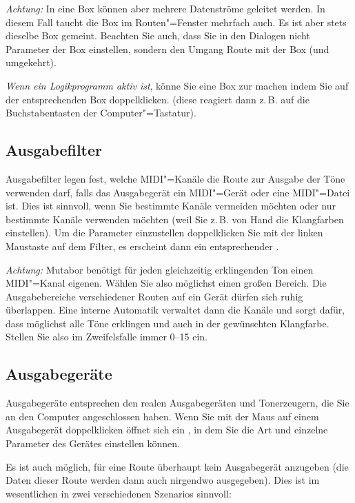 \emph{Achtung:} In eine Box können aber mehrere Datenströme 
geleitet werden. In diesem Fall taucht die Box im Routen"=Fenster 
mehrfach auch. Es ist aber stets dieselbe Box gemeint. Beachten 
Sie auch, dass Sie in den Dialogen nicht Parameter der Box einstellen, 
sondern den Umgang Route mit der Box (und umgekehrt).


\emph{Wenn ein Logikprogramm aktiv ist}, könne Sie eine Box 
zur  machen indem Sie auf der 
entsprechenden Box doppelklicken. (diese reagiert dann z.\,B. auf 
die Buchstabentasten der Computer"=Tastatur).

\subsection{Ausgabefilter}\label{sec:ausgabefilter}

Ausgabefilter legen fest, welche MIDI"=Kanäle die Route zur Ausgabe der 
Töne verwenden darf, falls das Ausgabegerät ein MIDI"=Gerät 
oder eine MIDI"=Datei ist. Dies ist sinnvoll, wenn Sie bestimmte 
Kanäle vermeiden möchten oder nur bestimmte Kanäle verwenden 
möchten (weil Sie z.\,B. von Hand die Klangfarben einstellen). 
Um die Parameter einzustellen doppelklicken Sie mit der linken 
Maustaste auf dem Filter, es erscheint dann ein entsprechender 
.


\emph{Achtung:} Mutabor benötigt für jeden gleichzeitig erklingenden
Ton einen MIDI"=Kanal eigenen. Wählen Sie also möglichst einen großen
Bereich. Die Ausgabebereiche verschiedener Routen auf ein Gerät dürfen
sich ruhig überlappen. Eine interne Automatik verwaltet dann die
Kanäle und sorgt dafür, dass möglichst alle Töne erklingen und auch in
der gewünschten Klangfarbe. Stellen Sie also im Zweifelsfalle immer
0--15 ein.

\subsection{Ausgabegeräte}\label{sec:ausgabegerate}

Ausgabegeräte entsprechen den realen Ausgabegeräten und Tonerzeugern, die Sie
an den Computer angeschlossen haben. Wenn Sie mit der Maus auf einem
Ausgabegerät doppelklicken öffnet sich ein
, in dem Sie die Art und einzelne Parameter
des Gerätes einstellen können.


Es ist auch möglich, für eine Route überhaupt kein Ausgabegerät 
anzugeben (die Daten dieser Route werden dann auch nirgendwo ausgegeben). 
Dies ist im wesentlichen in zwei verschiedenen Szenarios sinnvoll:

